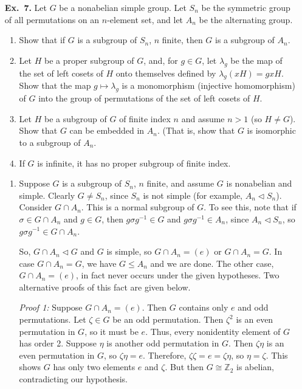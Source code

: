 \documentclass[12pt,reqno]{amsart}
\newcommand{\Z}{\ensuremath{\mathbb{Z}}}
\newcommand{\<}{\ensuremath{\langle}}
\renewcommand{\>}{\ensuremath{\rangle}}
\newcommand{\subnormal}{\ensuremath{\triangleleft}}
\begin{document}
\begin{enumerate}
\item[{\bf Ex.~7.}] 
    Let $G$ be a nonabelian simple group.  Let $S_n$ be the symmetric group of all
  permutations on an $n$-element set, and let $A_n$ be the alternating group.
    \begin{enumerate}[{\bf a.}]
    \item 
      Show that if $G$ is a subgroup of $S_n$, $n$ finite, then $G$ is a subgroup
      of $A_n$.
    \item Let $H$ be a proper subgroup of $G$, and, for $g\in G$, let $\lambda_g$ be
      the map of the set of left cosets of $H$ onto themselves defined by
      $\lambda_g(xH) = gxH$.  
      Show that the map $g\mapsto \lambda_g$ is a monomorphism (injective
      homomorphism) of $G$ into the group of permutations of the set of left
      cosets of $H$. 
    \item Let $H$ be a subgroup of $G$ of finite index $n$  and assume $n>1$ (so $H \neq G$).  
      Show that $G$ can be embedded in $A_n$. (That is, show that $G$ is
      isomorphic to a subgroup of $A_n$.
    \item If $G$ is infinite, it has no proper subgroup of finite index.
    \end{enumerate}

\medskip

    \begin{enumerate}
    \item Suppose $G$ is a subgroup of $S_n$, $n$ finite, and 
      assume $G$ is nonabelian and simple.  Clearly $G \neq S_n$, since $S_n$ is not simple
      (for example, $A_n \subnormal S_n$).
      Consider $G\cap A_n$. This is a normal subgroup of $G$.  To see this, note
      that if $\sigma \in G\cap A_n$ and $g\in G$, then $g\sigma g^{-1}\in G$ and
      $g\sigma g^{-1}\in A_n$, since $A_n \subnormal S_n$, so 
      $g\sigma g^{-1}\in G \cap A_n$.  
      
      So, $G\cap A_n\subnormal G$ and $G$ is simple, so $G\cap A_n = (e)$ or
      $G\cap A_n = G$.   
      In case $G\cap A_n = G$, we have $G\leq A_n$ and we are done.
      The other case, $G\cap A_n = (e)$, in fact never occurs under the given
      hypotheses. Two alternative proofs of this fact are given below.  

      {\it Proof 1:} Suppose $G\cap A_n = (e)$.  Then $G$ contains only $e$ and odd
      permutations.  
      Let $\zeta\in G$ be an odd permutation.  Then $\zeta^2$ is an even permutation in $G$, so it must
      be $e$.  Thus, every nonidentity element of $G$ has order 2.  Suppose $\eta$ is
      another odd permutation in $G$. Then $\zeta \eta$ is an even permutation in $G$, so
      $\zeta \eta = e$.  Therefore, $\zeta \zeta = e = \zeta \eta$, so $\eta = \zeta$.
      This shows $G$ has only two elements $e$ and $\zeta$.  But then $G\cong \Z_2$ is abelian,
      contradicting our hypothesis. 


\end{enumerate}
\end{enumerate}
\end{document}
